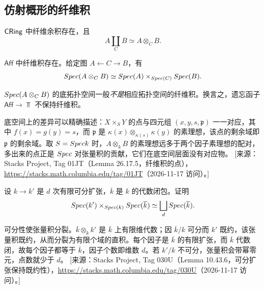 \subsection{仿射概形的纤维积}\label{sec:9.2}

\begin{exercise}\label{exc:9.2.1}
$\mathsf{CRing}$ 中纤维余积存在，且
\[
A \coprod_C B \simeq A \otimes_C B .
\]
\end{exercise}

\begin{corollary}\label{cor:9.2.2}
$\mathsf{Aff}$ 中纤维积存在。给定图 $A \leftarrow C \to B$，有
\[
Spec(A \otimes_C B) \simeq Spec(A) \times_{Spec(C)} Spec(B).
\]
\end{corollary}

\begin{warning}\label{warn:9.2.3}
$Spec(A \otimes_C B)$ 的底拓扑空间一般\emph{不是}相应拓扑空间的纤维积。换言之，遗忘函子 $\mathsf{Aff} \to \Top$ 不保持纤维积。
\end{warning}

\begin{yizhu}
底空间上的差异可以精确描述：$X \times_S Y$ 的点与四元组 $(x,y,s,\mathfrak p)$ 一一对应，其中 $f(x) = g(y) = s$，而 $\mathfrak p$ 是 $\kappa(x) \otimes_{\kappa(s)} \kappa(y)$ 的素理想，该点的剩余域即 $\mathfrak p$ 的剩余域。取 $S = Spec k$ 时，$A \otimes_k B$ 的素理想远多于两个因子素理想的配对，多出来的点正是 $Spec$ 对张量积的贡献，它们在底空间层面没有对应物。
[来源：Stacks Project, Tag 01JT（Lemma 26.17.5，纤维积的点），\url{https://stacks.math.columbia.edu/tag/01JT}（2026-11-17 访问）。]
\end{yizhu}

\begin{exercise}\label{exc:9.2.4}
设 $k \to k'$ 是 $d$ 次有限可分扩张，$\overline{k}$ 是 $k$ 的代数闭包。证明
\[
Spec(k') \times_{Spec(k)} Spec(\overline{k}) \simeq \bigsqcup_d Spec(\overline{k}).
\]
\end{exercise}

\begin{yizhu}
可分性使张量积分裂。$\overline{k} \otimes_k k'$ 是 $\overline{k}$ 上有限维代数；因 $\overline{k}/k$ 可分而 $k'$ 既约，该张量积既约，从而分裂为有限个域的直积。每个因子是 $\overline{k}$ 的有限扩张，而 $\overline{k}$ 代数闭，故每个因子都等于 $\overline{k}$，因子个数即维数 $d$。若 $k'/k$ 不可分，张量积会带幂零元，点数就少于 $d$。
[来源：Stacks Project, Tag 030U（Lemma 10.43.6，可分扩张保持既约性），\url{https://stacks.math.columbia.edu/tag/030U}（2026-11-17 访问）。]
\end{yizhu}

